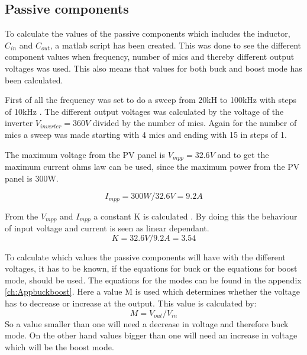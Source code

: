 \subsection{Passive components}  \label{passives}

To calculate the values of the passive components which includes the inductor, $C_{in}$ and $C_{out}$, a matlab  script has been created. This was done to see the different component values when frequency, number of mics and thereby different output voltages was used. This also means that values for both buck and boost mode has been calculated.

First of all the frequency was set to do a sweep from 20kH to 100kHz with steps of 10kHz . 
The different output voltages was calculated by the voltage of the inverter $V_{inverter}=360V$ divided by the number of mics. Again for the number of mics a sweep was made starting with 4 mics and ending with 15 in steps of 1.

The maximum voltage from the PV panel is $V_{mpp}=32.6V$ 
and to get the maximum current ohms law can be used, since the maximum power from the PV panel is 300W.

\begin{equation}
I_{mpp} = 300W/32.6V = 9.2A
\end{equation} 

From the $V_{mpp}$ and $I_{mpp}$ a constant K is calculated . 
By doing this the behaviour of input voltage and current is seen as linear dependant.
\begin{equation}
 K = 32.6V/9.2A = 3.54
 \end{equation} 
 
To calculate which values the passive components will have with the different voltages, it has to be known, if the equations for buck or the equations for boost mode, should be used.
 The equations for the modes can be found in the appendix \ref{ch:Appbuckboost}. Here a value M is used which determines whether the voltage has to decrease or increase at the output. This value is calculated by:
\begin{equation}
M = V_{out}/V_{in}
\end{equation}
So a value smaller than one will need a decrease in voltage and therefore buck mode. On the other hand values bigger than one will need an increase in voltage which will be the boost mode. 

